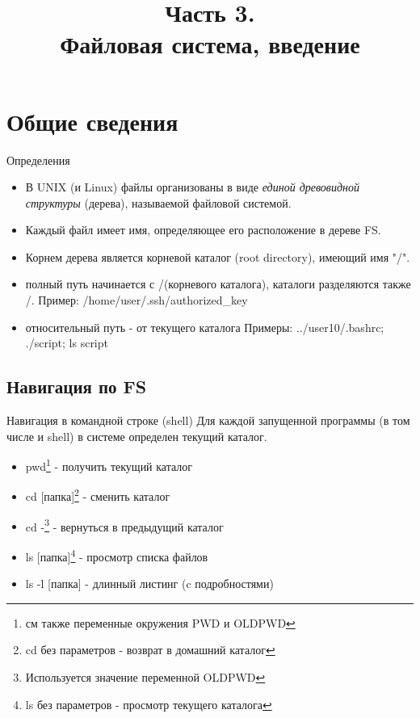 


\title[SaM Solutions. Linux QA Training]
{
  Часть 3.\\
  Файловая система, введение
}


\begin{frame}
  \titlepage
\end{frame}

\section{Общие сведения}
\begin{frame}{Определения}
  \begin{itemize}
    \item В UNIX (и Linux) файлы организованы в виде \emph{единой древовидной структуры} (дерева), называемой \alert{файловой системой}.
    \item \alert{Каждый файл имеет имя}, определяющее его расположение в дереве FS.
    \item Корнем дерева является \alert{корневой каталог} (root directory), имеющий имя \alert{"/"}.
  \end{itemize} \pause

  \begin{itemize}
    \item \alert{полный путь} начинается с \alert{/}(корневого каталога), каталоги разделяются также \alert{/}. \newline
      Пример: /home/user/.ssh/authorized\_key
    \item \alert{относительный путь} - от текущего каталога \newline
      Примеры: ../user10/.bashrc; ./script; ls script
  \end{itemize}

\end{frame}

\subsection{Навигация по FS}
\begin{frame}{Навигация в командной строке (shell)}
  Для каждой запущенной программы (в том числе и shell) в системе определен \alert{текущий каталог}. 
  \begin{itemize} 
    \item \alert{pwd}\footnote{см также переменные окружения \alert{PWD} и \alert{OLDPWD}} - получить текущий каталог
    \item \alert{cd [папка]}\footnote{\alert{cd} без параметров - возврат в домашний каталог} - сменить каталог
    \item \alert{cd -}\footnote{Используется значение переменной \alert{OLDPWD}} - вернуться в предыдущий каталог
    \item \alert{ls [папка]}\footnote{\alert{ls} без параметров - просмотр текущего каталога} - просмотр списка файлов
    \item \alert{ls -l [папка]} - длинный листинг (c подробностями)
  \end{itemize}
\end{frame}

